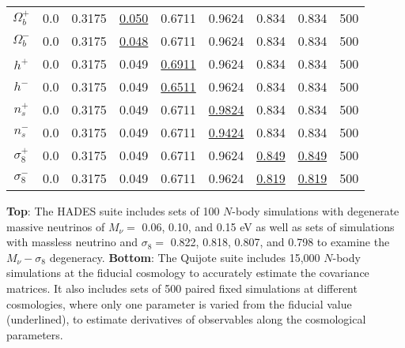 \documentclass[12pt, letterpaper, preprint]{aastex62}
\newcommand{\smnu}{M_\nu}
\begin{document}
\begin{table}
\begin{center}
\begin{tabular}{ccccccccc}
    $\Omega_b^+$    & 0.0   & 0.3175 & \underline{0.050} & 0.6711 & 0.9624 & 0.834 & 0.834 & 500 \\ 
    $\Omega_b^-$    & 0.0   & 0.3175 & \underline{0.048} & 0.6711 & 0.9624 & 0.834 & 0.834 & 500 \\ 
    $h^+$           & 0.0   & 0.3175 & 0.049 & \underline{0.6911} & 0.9624 & 0.834 & 0.834 & 500 \\ 
    $h^-$           & 0.0   & 0.3175 & 0.049 & \underline{0.6511} & 0.9624 & 0.834 & 0.834 & 500 \\ 
    $n_s^+$         & 0.0   & 0.3175 & 0.049 & 0.6711 & \underline{0.9824} & 0.834 & 0.834 & 500 \\ 
    $n_s^-$         & 0.0   & 0.3175 & 0.049 & 0.6711 & \underline{0.9424} & 0.834 & 0.834 & 500 \\ 
    $\sigma_8^+$    & 0.0   & 0.3175 & 0.049 & 0.6711 & 0.9624 & \underline{0.849} & \underline{0.849} & 500 \\ 
    $\sigma_8^-$    & 0.0   & 0.3175 & 0.049 & 0.6711 & 0.9624 & \underline{0.819} & \underline{0.819} & 500 \\[3pt]
    \hline
\end{tabular} \label{tab:sims}
\end{center}
    {\bf Top}: The HADES suite includes sets of 100 $N$-body simulations with degenerate massive neutrinos 
    of $\smnu = $ 0.06, 0.10, and 0.15 eV as well as sets of simulations with massless neutrino and 
    $\sigma_8 = $ 0.822, 0.818, 0.807, and 0.798 to examine the $\smnu-\sigma_8$ degeneracy. 
    {\bf Bottom}: The Quijote suite includes 15,000 $N$-body simulations at the fiducial cosmology 
    to accurately estimate the covariance matrices. It also includes sets of 500 paired fixed simulations 
    at different cosmologies, where only one parameter is varied from the fiducial value (underlined), 
    to estimate derivatives of observables along the cosmological parameters.
\end{table}
\end{document}
